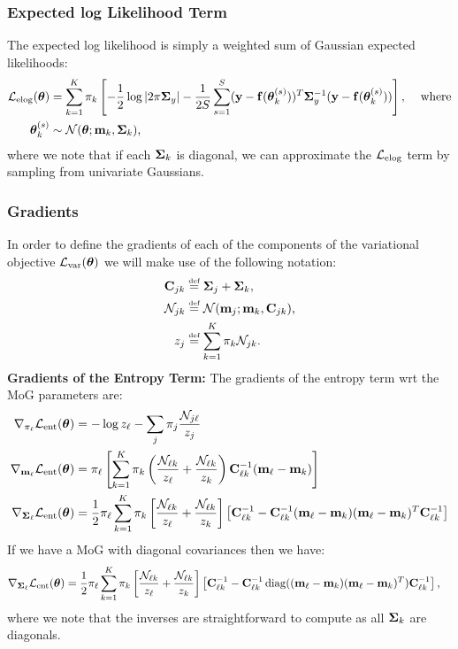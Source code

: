 \subsubsection{Expected log Likelihood Term}
The expected log likelihood is simply a weighted sum of Gaussian expected likelihoods:
\begin{align}
\lelog(\vectheta) & = \sum_{k=1}^{K}  \pi_{k}
\left[ 
	-\frac{1}{2} \log \det{2 \pi \Sigmay} - \frac{1}{2S} \sum_{s=1}^{S} (\vecy - \fthetask)^{T} \Sigmay^{-1} (\vecy - \fthetask)
\right] \text{, \quad where} \\
\thetask & \sim \Normal(\vectheta; \mqk, \Sigmaqk) \text{,} 
\end{align}
where we note that if each $\Sigmaqk$ is diagonal, we can approximate the $\lelog$ term by sampling from univariate Gaussians.
%
\subsubsection{Gradients}
In order to define the gradients of each of the components of the variational objective $\lvar(\vectheta)$ we will make use of the 
following notation:
\begin{align}
	\Cjk & \defeq \expandCjk  \text{,}\\
	\Normal_{jk} &  \defeq \Normal(\mqj; \mqk, \Cjk) \text{,} \\
	z_{j} & \defeq \sum_{k=1}^{K} \pik \Normal_{jk} \text{.} 
\end{align}
\textbf{Gradients of the Entropy Term:} The gradients of the entropy term wrt the MoG parameters are:
\begin{align}
	\gradient_{\pil} \lent(\vectheta) &= - \log \zl - \sum_{j} \pij \frac{\Njl}{\zj}  \\
	\gradient_{\mql} \lent(\vectheta)
	&= \pil \left[ 
		\sum_{k=1}^{K} \pik \left( \frac{\Nlk}{\zl} + \frac{\Nlk}{\zk} \right)   \Clk^{-1} (\mql - \mqk) 
	\right] \\
	\gradient_{\Sigmaql} \lent(\vectheta)
	&=
	\frac{1}{2} \pil 
	\sum_{k=1}^{K} \pik \left[  \frac{\Nlk}{\zl} + \frac{\Nlk}{\zk} \right]
		\left[ \Clk^{-1} - \Clk^{-1} 
		(\mql - \mqk) (\mql - \mqk)^{T} \Clk^{-1} \right]
\end{align}
If we have a MoG with diagonal covariances then we have:
\begin{align}
	\gradient_{\Sigmaql} \lent(\vectheta)
	&=
		\frac{1}{2} \pil 
	\sum_{k=1}^{K} \pik \left[  \frac{\Nlk}{\zl} + \frac{\Nlk}{\zk} \right]
		\left[ \Clk^{-1} - \Clk^{-1} 
		\diag ( (\mql - \mqk) (\mql - \mqk)^{T} ) \Clk^{-1} \right] \text{,}
\end{align}
where we note that the inverses are straightforward to compute as all $\Sigmaqk$ are diagonals. \\ 


